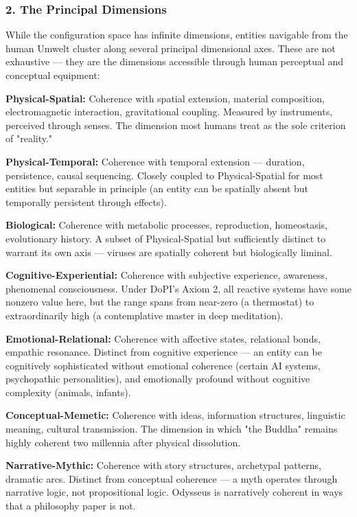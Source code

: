 \subsubsection*{2. The Principal Dimensions}


While the configuration space has infinite dimensions, entities navigable from the human Umwelt cluster along several principal dimensional axes. These are not exhaustive — they are the dimensions accessible through human perceptual and conceptual equipment:


\textbf{Physical-Spatial:} Coherence with spatial extension, material composition, electromagnetic interaction, gravitational coupling. Measured by instruments, perceived through senses. The dimension most humans treat as the sole criterion of "reality."


\textbf{Physical-Temporal:} Coherence with temporal extension — duration, persistence, causal sequencing. Closely coupled to Physical-Spatial for most entities but separable in principle (an entity can be spatially absent but temporally persistent through effects).


\textbf{Biological:} Coherence with metabolic processes, reproduction, homeostasis, evolutionary history. A subset of Physical-Spatial but sufficiently distinct to warrant its own axis — viruses are spatially coherent but biologically liminal.


\textbf{Cognitive-Experiential:} Coherence with subjective experience, awareness, phenomenal consciousness. Under DoPI's Axiom 2, all reactive systems have some nonzero value here, but the range spans from near-zero (a thermostat) to extraordinarily high (a contemplative master in deep meditation).


\textbf{Emotional-Relational:} Coherence with affective states, relational bonds, empathic resonance. Distinct from cognitive experience — an entity can be cognitively sophisticated without emotional coherence (certain AI systems, psychopathic personalities), and emotionally profound without cognitive complexity (animals, infants).


\textbf{Conceptual-Memetic:} Coherence with ideas, information structures, linguistic meaning, cultural transmission. The dimension in which "the Buddha" remains highly coherent two millennia after physical dissolution.


\textbf{Narrative-Mythic:} Coherence with story structures, archetypal patterns, dramatic arcs. Distinct from conceptual coherence — a myth operates through narrative logic, not propositional logic. Odysseus is narratively coherent in ways that a philosophy paper is not.


